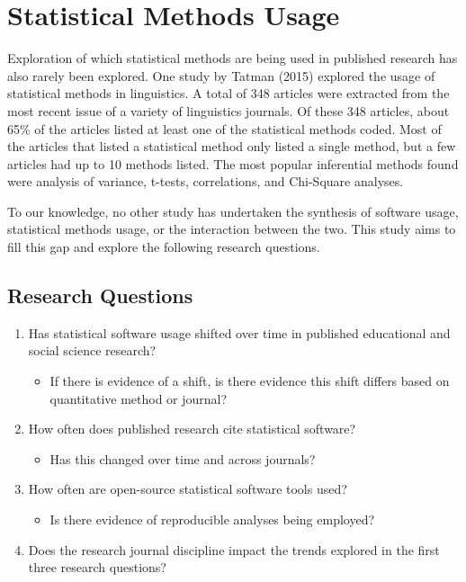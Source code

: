 \documentclass[
  english,
  ,man]{apa6}
\providecommand{\tightlist}{%
  \setlength{\itemsep}{0pt}\setlength{\parskip}{0pt}}
\begin{document}
\hypertarget{statistical-methods-usage}{%
\section{Statistical Methods Usage}\label{statistical-methods-usage}}

Exploration of which statistical methods are being used in published research has also rarely been explored. One study by Tatman (2015) explored the usage of statistical methods in linguistics. A total of 348 articles were extracted from the most recent issue of a variety of linguistics journals. Of these 348 articles, about 65\% of the articles listed at least one of the statistical methods coded. Most of the articles that listed a statistical method only listed a single method, but a few articles had up to 10 methods listed. The most popular inferential methods found were analysis of variance, t-tests, correlations, and Chi-Square analyses.

To our knowledge, no other study has undertaken the synthesis of software usage, statistical methods usage, or the interaction between the two. This study aims to fill this gap and explore the following research questions.

\hypertarget{research-questions}{%
\subsection{Research Questions}\label{research-questions}}

\begin{enumerate}
\def\labelenumi{\arabic{enumi}.}
\tightlist
\item
  Has statistical software usage shifted over time in published educational and social science research?

  \begin{itemize}
  \tightlist
  \item
    If there is evidence of a shift, is there evidence this shift differs based on quantitative method or journal?
  \end{itemize}
\item
  How often does published research cite statistical software?

  \begin{itemize}
  \tightlist
  \item
    Has this changed over time and across journals?
  \end{itemize}
\item
  How often are open-source statistical software tools used?

  \begin{itemize}
  \tightlist
  \item
    Is there evidence of reproducible analyses being employed?
  \end{itemize}
\item
  Does the research journal discipline impact the trends explored in the first three research questions?
\end{enumerate}
\end{document}
